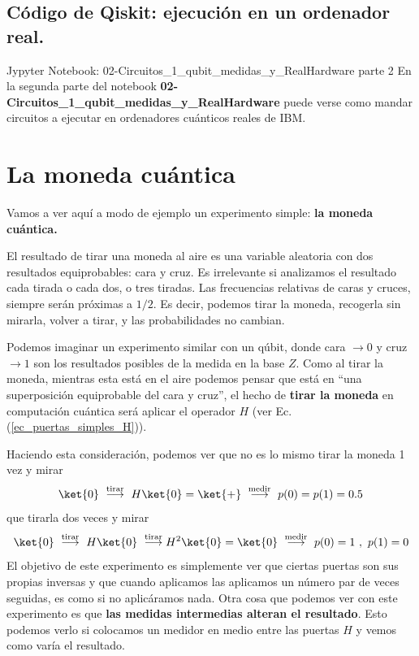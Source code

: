 \documentclass[a4paper,11pt]{book} %
\numberwithin{equation}{chapter}
\begin{document}
		\subsection{Código de Qiskit: ejecución en un ordenador real.}
		
	\begin{mybox_orange}{Jypyter Notebook: 02-Circuitos\_1\_qubit\_medidas\_y\_RealHardware parte 2}
	En la segunda parte del notebook \textbf{02-Circuitos\_1\_qubit\_medidas\_y\_RealHardware} puede verse como mandar circuitos a ejecutar en ordenadores 
	cuánticos reales de IBM.
	\end{mybox_orange}
	
		

    \section{La moneda cuántica}
    
Vamos a ver aquí a modo de ejemplo un experimento simple: \textbf{la moneda cuántica.}

El resultado de tirar una moneda al aire es una variable aleatoria con dos resultados equiprobables:  cara y cruz.  Es irrelevante si analizamos el resultado cada tirada o cada dos, o tres tiradas. Las frecuencias relativas de caras y cruces, siempre serán próximas a $1/2$. Es decir, podemos tirar la moneda, recogerla sin mirarla, volver a tirar, y las probabilidades no cambian.

Podemos imaginar un experimento similar con un qúbit, donde cara $\to 0$ y cruz $\to 1$ son los resultados posibles de la medida en la base $Z$. Como al tirar la moneda, mientras esta está en el aire podemos pensar que está en ``una superposición equiprobable del cara y cruz'', el hecho de \textbf{tirar la moneda} en computación cuántica será aplicar el operador $H$ (ver Ec. (\ref{ec_puertas_simples_H})). 

Haciendo esta consideración, podemos ver que no es lo mismo tirar la moneda 1 vez y mirar 
$$
\ket{0}~ \stackrel{\rm tirar}{\longrightarrow} ~ H \ket{0}= \ket{+} ~ \stackrel{\rm medir}{\longrightarrow} ~p(0) = p(1) = 0.5
$$
que tirarla dos veces y mirar
$$
\ket{0}~ \stackrel{\rm tirar}{\longrightarrow} ~ H \ket{0}~ \stackrel{\rm tirar}{\longrightarrow} H^2\ket{0} = \ket{0} ~ \stackrel{\rm medir}{\longrightarrow} ~p(0) = 1 ~,~p(1) = 0
$$
El objetivo de este experimento es simplemente ver que ciertas puertas son sus propias inversas y que cuando aplicamos las aplicamos un número par de veces seguidas, es como si no aplicáramos nada. Otra cosa que podemos ver con este experimento es que \textbf{las medidas intermedias alteran el resultado}. Esto podemos verlo si colocamos un medidor en medio entre las puertas $H$ y vemos como varía el resultado.
\end{document}
